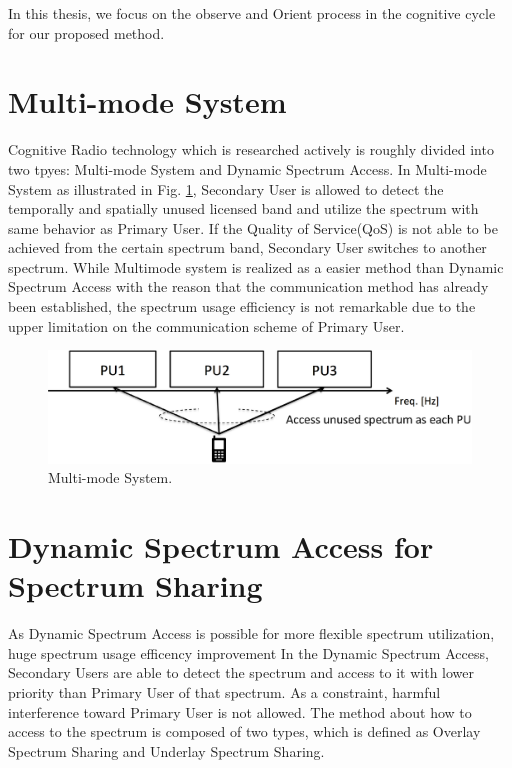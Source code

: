 In this thesis, we focus on the observe and Orient process in the cognitive cycle for our proposed method.

\section{Multi-mode System}
Cognitive Radio technology which is researched actively is roughly divided into two tpyes: Multi-mode System and Dynamic Spectrum Access. In Multi-mode System as illustrated in Fig. \ref{fig:hetero}, Secondary User is allowed to detect the temporally and spatially unused licensed band and utilize the spectrum with same behavior as Primary User. If the Quality of Service(QoS) is not able to be achieved from the certain spectrum band, Secondary User switches to another spectrum. While Multimode system is realized as a easier method than Dynamic Spectrum Access with the reason that the communication method has already been established, the spectrum usage efficiency is not remarkable due to the upper limitation on the communication scheme of Primary User.

\begin{figure}[!htp]
\begin{center}
\includegraphics[width=120mm,clip]{multimode.eps}
\caption{Multi-mode System.}
\label{fig:hetero}
\end{center}
\end{figure}

\section{Dynamic Spectrum Access for Spectrum Sharing}
As Dynamic Spectrum Access is possible for more flexible spectrum utilization, huge spectrum usage efficency improvement In the Dynamic Spectrum Access, Secondary Users are able to detect the spectrum and access to it with lower priority than Primary User of that spectrum. As a constraint, harmful interference toward Primary User is not allowed. The method about how to access to the spectrum is composed of two types, which is defined as Overlay Spectrum Sharing\cite{ref:overlay} and Underlay Spectrum Sharing\cite{ref:underlay}.


